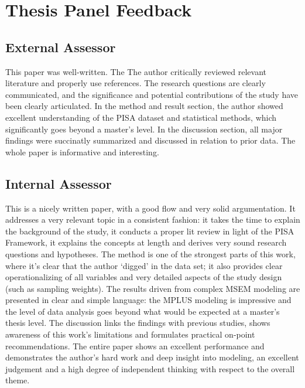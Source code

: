 \chapter{Thesis Panel Feedback}
\label{app:feedback}

\section{External Assessor}

This paper was well-written. The The author critically reviewed relevant literature and properly use references. The research questions are clearly communicated, and the significance and potential contributions of the study have been clearly articulated. In the method and result section, the author showed excellent understanding of the PISA dataset and statistical methods, which significantly goes beyond a master's level. In the discussion section, all major findings were succinatly summarized and discussed in relation to prior data. The whole paper is informative and interesting.

\section{Internal Assessor}

This is a nicely written paper, with a good flow and very solid argumentation. It addresses a very relevant topic in a consistent fashion: it takes the time to explain the background of the study, it conducts a proper lit review in light of the PISA Framework, it explains the concepts at length and derives very sound research questions and hypotheses. The method is one of the strongest parts of this work, where it’s clear that the author ‘digged’ in the data set; it also provides clear operationalizing of all variables and very detailed aspects of the study design (such as sampling weights). The results driven from complex MSEM modeling are presented in clear and simple language: the MPLUS modeling is impressive and the level of data analysis goes beyond what would be expected at a master’s thesis level. The discussion links the findings with previous studies, shows awareness of this work’s limitations and formulates practical on-point recommendations. The entire paper shows an excellent performance and demonstrates the author’s hard work and deep insight into modeling, an excellent judgement and a high degree of independent thinking with respect to the overall theme.
